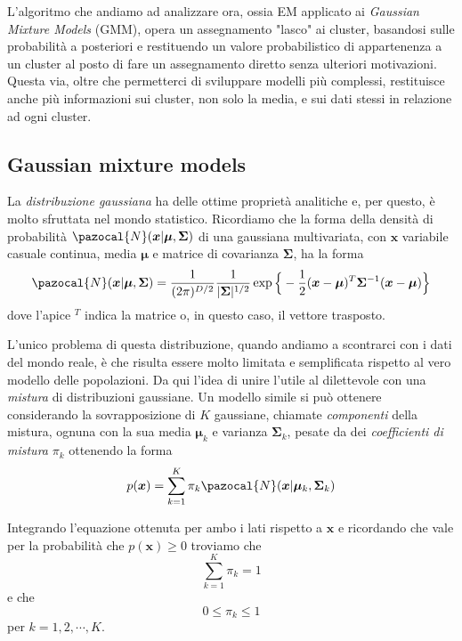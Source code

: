 \documentclass{report}
\begin{document}
L'algoritmo che andiamo ad analizzare ora, ossia EM applicato ai \textit{Gaussian Mixture Models} (GMM), opera un assegnamento "lasco" ai cluster, basandosi sulle probabilità a posteriori e restituendo un valore probabilistico di appartenenza a un cluster al posto di fare un assegnamento diretto senza ulteriori motivazioni. Questa via, oltre che permetterci di sviluppare modelli più complessi, restituisce anche più informazioni sui cluster, non solo la media, e sui dati stessi in relazione ad ogni cluster.

\subsection{Gaussian mixture models}

La \textit{distribuzione gaussiana} ha delle ottime proprietà analitiche e, per questo, è molto sfruttata nel mondo statistico. Ricordiamo che la forma della densità di probabilità $\pazocal{N}(\bm{x}|\bm\mu, \bm\Sigma)$ di una gaussiana multivariata, con $\bm{x}$ variabile casuale continua, media $\bm\mu$ e matrice di covarianza $\bm\Sigma$, ha la forma
\begin{equation}
\pazocal{N}(\bm{x}|\bm\mu, \bm\Sigma) = \frac{1}{(2\pi)^{D/2}}\frac{1}{|\bm\Sigma|^{1/2}}\exp\Big\{-\frac{1}{2}(\bm{x} - \bm\mu)^T\bm\Sigma^{-1}(\bm{x} - \bm\mu)\Big\}
\end{equation}
dove l'apice $^T$ indica la matrice o, in questo caso, il vettore trasposto.

L'unico problema di questa distribuzione, quando andiamo a scontrarci con i dati del mondo reale, è che risulta essere molto limitata e semplificata rispetto al vero modello delle popolazioni. Da qui l'idea di unire l'utile al dilettevole con una \textit{mistura} di distribuzioni gaussiane. Un modello simile si può ottenere considerando la sovrapposizione di $K$ gaussiane, chiamate \textit{componenti} della mistura, ognuna con la sua media $\bm\mu_k$ e varianza $\bm\Sigma_k$, pesate da dei \textit{coefficienti di mistura} $\pi_k$ ottenendo la forma
\begin{equation}\label{eq:mistura}
p(\bm{x}) = \sum_{k=1}^{K} \pi_k\pazocal{N}(\bm{x}|\bm\mu_k, \bm\Sigma_k)
\end{equation}

Integrando l'equazione ottenuta per ambo i lati rispetto a $\bm{x}$ e ricordando che vale per la probabilità che $p(\bm{x}) \geq 0$ troviamo che
\begin{equation}\label{eq:limitazione_somma}
\sum_{k=1}^{K} \pi_k = 1
\end{equation}
e che
\begin{equation}
0 \leq \pi_k \leq 1
\end{equation}
per $k = 1,2,\cdots,K$.
\end{document}
